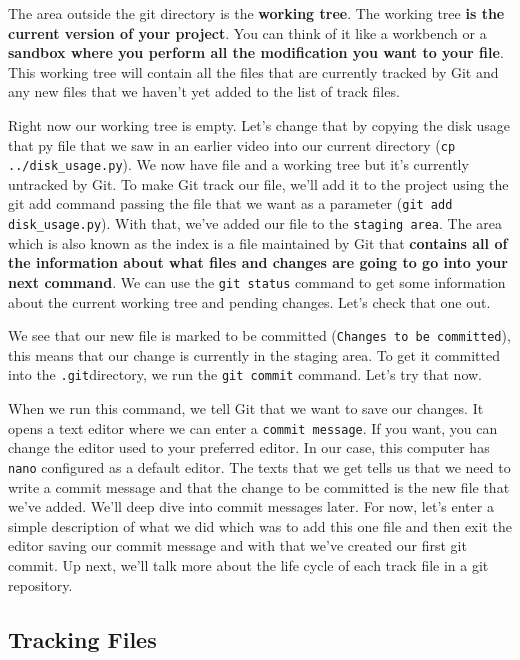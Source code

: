 	The area outside the git directory is the \textbf{working tree}. The working tree \textbf{is the current version of your project}. You can think of it like a workbench or a \textbf{sandbox where you perform all the modification you want to your file}. This working tree will contain all the files that are currently tracked by Git and any new files that we haven't yet added to the list of track files. 
	
	Right now our working tree is empty. Let's change that by copying the disk usage that py file that we saw in an earlier video into our current directory (\verb|cp ../disk_usage.py|). We now have file and a working tree but it's currently untracked by Git.
	To make Git track our file, we'll add it to the project using the git add command passing the file that we want as a parameter (\verb|git add disk_usage.py|). 
	With that, we've added our file to the \texttt{staging area}. The  area which is also known as the index is a file maintained by Git that \textbf{contains all of the information about what files and changes are going to go into your next command}. We can use the \texttt{git status} command to get some information about the current working tree and pending changes. Let's check that one out.
	
	We see that our new file is marked to be committed (\texttt{Changes to be committed}), this means that our change is currently in the staging area. To get it committed into the \verb|.git|directory, we run the \texttt{git commit} command. Let's try that now.

	When we run this command, we tell Git that we want to save our changes. It opens a text editor where we can enter a \texttt{commit message}. If you want, you can change the editor used to your preferred editor. In our case, this computer has \texttt{nano} configured as a default editor. The texts that we get tells us that we need to write a commit message and that the change to be committed is the new file that we've added. We'll deep dive into commit messages later. For now, let's enter a simple description of what we did which was to add this one file and then exit the editor saving our commit message and with that we've created our first git commit. Up next, we'll talk more about the life cycle of each track file in a git repository.
	
	\subsection{Tracking Files}
	
